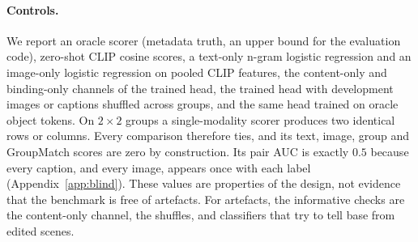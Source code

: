 \paragraph{Controls.}
We report an oracle scorer (metadata truth, an upper bound for the evaluation code), zero-shot CLIP
cosine scores, a text-only n-gram logistic regression and an image-only logistic regression on
pooled CLIP features, the content-only and binding-only channels of the trained head, the trained
head with development images or captions shuffled across groups, and the same head trained on
oracle object tokens. On $2{\times}2$ groups a single-modality scorer produces two identical rows or
columns. Every comparison therefore ties, and its text, image, group and GroupMatch scores are zero
by construction. Its pair AUC is exactly $0.5$ because every caption, and every image, appears once
with each label (Appendix~\ref{app:blind}). These values are properties of the design, not evidence
that the benchmark is free of artefacts. For artefacts, the informative checks are the content-only
channel, the shuffles, and classifiers that try to tell base from edited scenes.
